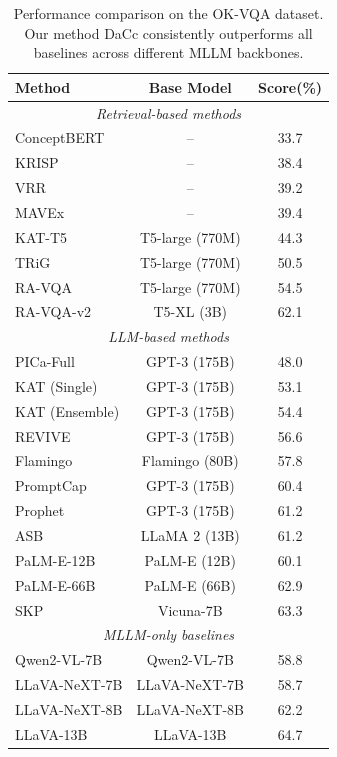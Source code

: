 \documentclass[manuscript,screen,review]{acmart}
\begin{document}
\begin{table}[t]
\centering
\caption{Performance comparison on the OK-VQA dataset. Our method DaCc consistently outperforms all baselines across different MLLM backbones.}
\label{tab:okvqa}
\begin{tabular}{l c c}
\hline
Method & Base Model & Score(\%) \\
\hline
\multicolumn{3}{c}{\textit{Retrieval-based methods}} \\
\hline
ConceptBERT      & --              & 33.7 \\
KRISP            & --              & 38.4 \\
VRR              & --              & 39.2 \\
MAVEx            & --              & 39.4 \\
KAT-T5           & T5-large (770M) & 44.3 \\
TRiG             & T5-large (770M) & 50.5 \\
RA-VQA           & T5-large (770M) & 54.5 \\
RA-VQA-v2        & T5-XL (3B)      & 62.1 \\
\hline
\multicolumn{3}{c}{\textit{LLM-based methods}} \\
\hline
PICa-Full        & GPT-3 (175B)   & 48.0 \\
KAT (Single)     & GPT-3 (175B)   & 53.1 \\
KAT (Ensemble)   & GPT-3 (175B)   & 54.4 \\
REVIVE           & GPT-3 (175B)   & 56.6 \\
Flamingo         & Flamingo (80B) & 57.8 \\
PromptCap        & GPT-3 (175B)   & 60.4 \\
Prophet          & GPT-3 (175B)   & 61.2 \\
ASB              & LLaMA 2 (13B)  & 61.2 \\
PaLM-E-12B       & PaLM-E (12B)   & 60.1 \\
PaLM-E-66B       & PaLM-E (66B)   & 62.9 \\
SKP              & Vicuna-7B      & 63.3 \\
\hline
\multicolumn{3}{c}{\textit{MLLM-only baselines}} \\
\hline
Qwen2-VL-7B      & Qwen2-VL-7B    & 58.8 \\
LLaVA-NeXT-7B    & LLaVA-NeXT-7B  & 58.7 \\
LLaVA-NeXT-8B    & LLaVA-NeXT-8B  & 62.2 \\
LLaVA-13B        & LLaVA-13B      & 64.7 \\

\end{tabular}
\end{table}
\end{document}
